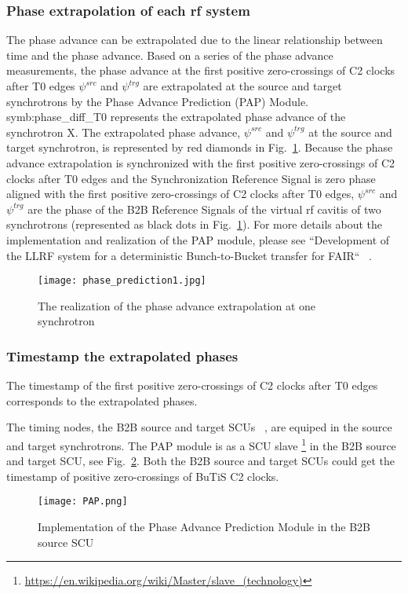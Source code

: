 \subsubsection{Phase extrapolation of each rf system}
The phase advance can be extrapolated due to the linear relationship between time and the phase advance. Based on a series of the phase advance measurements, the phase advance at the first positive zero-crossings of C2 clocks after T0 edges $\psi^\mathit{src}$ and $\psi^\mathit{trg}$ are extrapolated at the source and target synchrotrons by the Phase Advance Prediction (\gls{PAP}) Module.  \gls{symb:phase_diff_T0} represents the extrapolated phase advance of the synchrotron X. The extrapolated phase advance, $\psi^\mathit{src}$ and $\psi^\mathit{trg}$ at the source and target synchrotron, is represented by red diamonds in Fig.~\ref{phase_prediction1}. Because the phase advance extrapolation is synchronized with the first positive zero-crossings of C2 clocks after T0 edges and the Synchronization Reference Signal is zero phase aligned with the first positive zero-crossings of C2 clocks after T0 edges, $\psi^\mathit{src}$ and $\psi^\mathit{trg}$ are the phase of the B2B Reference Signals of the virtual rf cavitis of two synchrotrons (represented as black dots in Fig.~\ref{phase_prediction1}). For more details about the implementation and realization of the PAP module, please see ``Development of the LLRF system for a deterministic Bunch-to-Bucket transfer for FAIR`` ~\cite{ferrand_development_????}.   
\begin{figure}[!htb]
   \centering   
   \texttt{[image: phase\_prediction1.jpg]}
   \caption{The realization of the phase advance extrapolation at one synchrotron}
   \label{phase_prediction1}
\end{figure}
\subsubsection{Timestamp the extrapolated phases}
The timestamp of the first positive zero-crossings of C2 clocks after T0 edges corresponds to the extrapolated phases. 

The timing nodes, the B2B source and target SCUs ~\cite{beck_new_2012, thieme_scu_2013}, are equiped in the source and target synchrotrons. The PAP module is as a SCU slave \footnote{\url{https://en.wikipedia.org/wiki/Master/slave_(technology)}} in the B2B source and target SCU, see Fig.~\ref{PAP}. Both the B2B source and target SCUs could get the timestamp of positive zero-crossings of \gls{BuTiS} C2 clocks. 
 \begin{figure}[!htb]
   \centering   
   \texttt{[image: PAP.png]}
   \caption{Implementation of the Phase Advance Prediction Module in the B2B source SCU}
   \label{PAP}
\end{figure}

